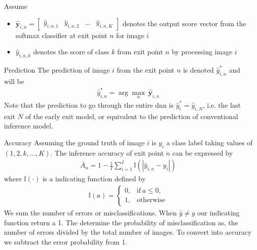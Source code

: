 \begin{enumdescript}
		Assume
		\begin{itemize}
			\item $ \mathbf{\hat{y}}_{i,n} = \left[\begin{array}{cccc}\hat{y}_{i,n,1} & \hat{y}_{i,n,2} & \dots & \hat{y}_{i,n,K}\end{array}\right] $ denotes the output score vector from the softmax classifier at exit point $ n $ for image $ i $
			\item $ \hat{y}_{i,n,k} $ denotes the score of class $ k $ from exit point $ n $ by processing image $ i $
				
			\end{itemize}
		\begin{enumdescript}
			\item[Prediction] The prediction of image $ i $ from the exit point $ n $ is denoted $ \hat{y}^*_{i,n} $ and will be
			\begin{align}
			\hat{y}^*_{i,n} = \arg \underset{n}{\max}\: \mathbf{\hat{y}}_{i,n}
			\end{align}
			Note that the prediction to go through the entire \gls{dnn} is $ \hat{y}^*_i  = \hat{y}_{i,N} $, i.e. the last exit $ N $ of the early exit model, or equivalent to the prediction of conventional inference model.
			
			\item[Accuracy] Assuming the ground truth of image $ i $ is $ y_i$ a class label taking values of $\left(1, 2, k, \dots, K \right) $. The inference accuracy of exit point $ n $ can be expressed by
			\begin{align}
			\bar{A}_{n}=1-\frac{1}{I} \sum_{i=1}^{I} \mathbb{I}\left(\left|\hat{y}_{i,n}-y_{i}\right|\right)
			\end{align}
			where $ \mathbb{I(\cdot)}  $ is a indicating function defined by
			\begin{align}
			\mathbb{I}(a)= \begin{cases}
			0, & \mathrm{if\:} a \leq 0, \\
			1, & \mathrm{otherwise}
			\end{cases}
			\end{align}
			We sum the number of errors or misclassifications. When $ \hat{y} \neq y $ our indicating function return a 1. The determine the probability of misclassification as, the number of errors divided by the total number of images. To convert into accuracy we subtract the error probability from 1.    
			
			
			
		\end{enumdescript}
	

\end{enumdescript}
